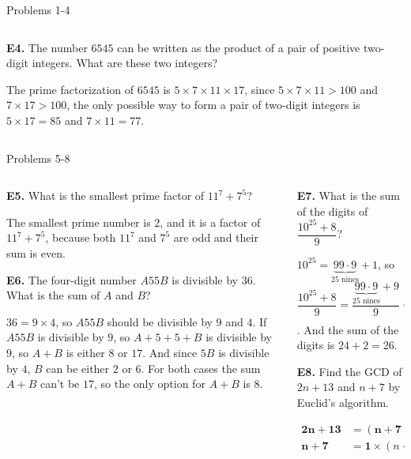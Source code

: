 \documentclass[9pt,aspectratio=169,]{beamer}
\begin{document}
\begin{frame}{Problems 1-4}
\begin{columns}[T]
\begin{column}{0.5\textwidth}
        \begin{problem}
            \textbf{E4.} The number $6545$ can be written as the product of a pair of positive two-digit integers. What are these two integers?
        \end{problem}
        The prime factorization of $6545$ is $5 \times 7 \times 11 \times 17$, since $5 \times 7 \times 11 > 100$ and $7 \times 17 > 100$, the only possible way to form a pair of two-digit integers is $5 \times 17 = \boxed{85}$ and $7 \times 11 = \boxed{77}$.
    \end{column}
  \end{columns}
\end{frame}

\begin{frame}{Problems 5-8}
  \begin{columns}[T]
    \begin{column}{0.5\textwidth}
        \begin{problem}
            \textbf{E5.} What is the smallest prime factor of $11^7 + 7^5$?
        \end{problem}
        The smallest prime number is $2$, and it is a factor of $11^7 + 7^5$, because both $11^7$ and $7^5$ are odd and their sum is even.

        \begin{problem}
            \textbf{E6.} The four-digit number $A55B$ is divisible by $36$. What is the sum of $A$ and $B$?
        \end{problem}
        $36 = 9 \times 4$, so $A55B$ should be divisible by $9$ and $4$. If $A55B$ is divisible by $9$, so $A + 5 + 5 + B$ is divisible by $9$, so $A + B$ is either $8$ or $17$. And since $5B$ is divisible by $4$, $B$ can be either $2$ or $6$. For both cases the sum $A + B$ can't be $17$, so the only option for $A + B$ is $\boxed{8}$. 
    \end{column}
    \begin{column}{0.5\textwidth}
        \begin{problem}
            \textbf{E7.} What is the sum of the digits of $\dfrac{10^{25}+8}{9}$?
        \end{problem}
        $10^{25} = \underbrace{99\cdot 9}_{25\text{ nines}} + 1$, so $\dfrac{10^{25}+8}{9} = \dfrac{\underbrace{99\cdot 9}_{25\text{ nines}} + 9}{9} = \underbrace{11\cdot 1}_{25\text{ ones}} + 1 = \underbrace{11\cdot 1}_{24\text{ nines}}\!2$.
        And the sum of the digits is $24 + 2 = \boxed{26}$.
        \begin{problem}
            \textbf{E8.} Find the GCD of $2n+13$ and $n+7$ by Euclid's algorithm.
        \end{problem}
        \begin{align*}
            \mathbf{2n + 13} &= (\mathbf{n+7}) \times 2 - 1,\\
            \mathbf{n + 7} &= \boxed{\mathbf{1}} \times (n + 7) + 0.
        \end{align*}

    \end{column}
  \end{columns}
\end{frame}
\end{document}
